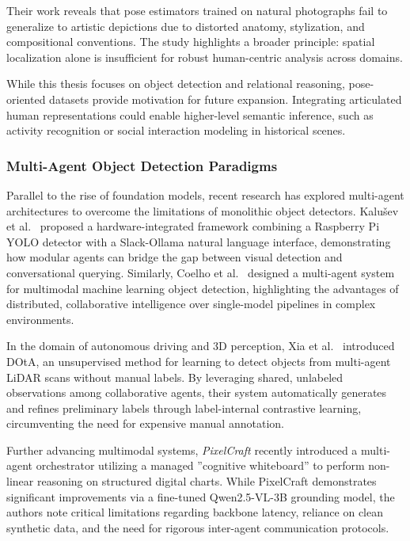 \documentclass[12pt,onecolumn,a4paper]{IEEEtran}
\begin{document}
Their work reveals that pose estimators trained on natural photographs fail to generalize to artistic depictions due to distorted anatomy, stylization, and compositional conventions. The study highlights a broader principle: spatial localization alone is insufficient for robust human-centric analysis across domains.

While this thesis focuses on object detection and relational reasoning, pose-oriented datasets provide motivation for future expansion. Integrating articulated human representations could enable higher-level semantic inference, such as activity recognition or social interaction modeling in historical scenes.

\subsubsection{Multi-Agent Object Detection Paradigms}
Parallel to the rise of foundation models, recent research has explored multi-agent architectures to overcome the limitations of monolithic object detectors. Kalušev et al.~\cite{kalusev_multiagent} proposed a hardware-integrated framework combining a Raspberry Pi YOLO detector with a Slack-Ollama natural language interface, demonstrating how modular agents can bridge the gap between visual detection and conversational querying. Similarly, Coelho et al.~\cite{coelho2023multiagent} designed a multi-agent system for multimodal machine learning object detection, highlighting the advantages of distributed, collaborative intelligence over single-model pipelines in complex environments.

In the domain of autonomous driving and 3D perception, Xia et al.~\cite{xia2025dota} introduced DOtA, an unsupervised method for learning to detect objects from multi-agent LiDAR scans without manual labels. By leveraging shared, unlabeled observations among collaborative agents, their system automatically generates and refines preliminary labels through label-internal contrastive learning, circumventing the need for expensive manual annotation.

Further advancing multimodal systems, \textit{PixelCraft} \cite{pixelcraft2025} recently introduced a multi-agent orchestrator utilizing a managed ''cognitive whiteboard'' to perform non-linear reasoning on structured digital charts. While PixelCraft demonstrates significant improvements via a fine-tuned Qwen2.5-VL-3B grounding model, the authors note critical limitations regarding backbone latency, reliance on clean synthetic data, and the need for rigorous inter-agent communication protocols.
\end{document}
